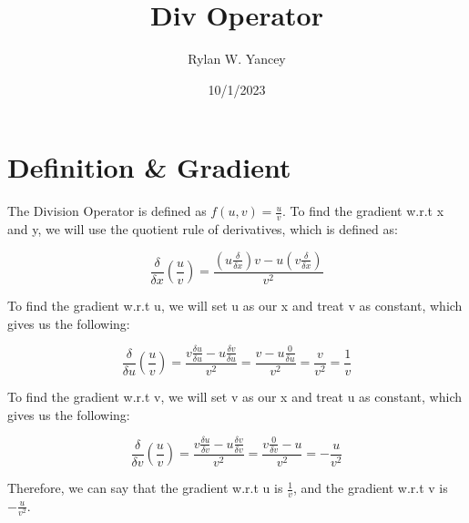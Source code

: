 \documentclass{article}
\author{Rylan W. Yancey}
\date{10/1/2023}
\title{Div Operator}
\begin{document}
    \maketitle
    \section*{Definition \& Gradient}
        The Division Operator is defined as $f(u, v) = \frac{u}{v}$. To find the gradient w.r.t x and y, we will
        use the quotient rule of derivatives, which is defined as:

        $$\frac{\delta}{\delta{x}}(\frac{u}{v}) = \frac{(u\frac{\delta}{\delta{x}})v - u(v\frac{\delta}{\delta{x}})}{v^2}$$

        To find the gradient w.r.t u, we will set u as our x and treat v as constant, which gives us the following:

        $$\frac{\delta}{\delta{u}}(\frac{u}{v}) = \frac{v\frac{\delta{u}}{\delta{u}} - u\frac{\delta{v}}{\delta{u}}}{v^2} 
        = \frac{v - u\frac{0}{\delta{u}}}{v^2} = \frac{v}{v^2} = \frac{1}{v}$$

        To find the gradient w.r.t v, we will set v as our x and treat u as constant, which gives us the following:

        $$\frac{\delta}{\delta{v}}(\frac{u}{v}) = \frac{v\frac{\delta{u}}{\delta{v}} - u\frac{\delta{v}}{\delta{v}}}{v^2} 
        = \frac{v\frac{0}{\delta{v}} - u}{v^2} = -\frac{u}{v^2}$$

        Therefore, we can say that the gradient w.r.t u is $\frac{1}{v}$, and the gradient w.r.t v is $-\frac{u}{v^2}$.
\end{document}
